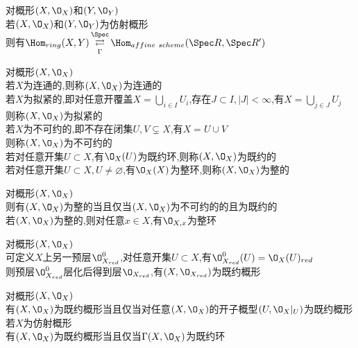 \begin{dingli}
对概形$(X,\O_{X})$和$(Y,\O_{Y})$\\
若$(X,\O_{X})$和$(Y,\O_{Y})$为仿射概形\\
则有$\Hom_{ring}(X,Y)\mathop{\rightleftarrows}\limits_{\Gamma}^{\Spec}\Hom_{affine\ scheme}(\Spec R,\Spec R')$
\end{dingli}

\begin{dingyi}
对概形$(X,\O_{X})$\\
若$X$为连通的,则称$(X,\O_{X})$为连通的\\
若$X$为拟紧的,即对任意开覆盖$X=\bigcup\limits_{i\in I}U_i$,存在$J\subset I,|J|<\infty$,有$X=\bigcup\limits_{j\in J}U_j$\\
则称$(X,\O_{X})$为拟紧的\\
若$X$为不可约的,即不存在闭集$U,V\subsetneq X$,有$X=U\cup V$\\
则称$(X,\O_{X})$为不可约的\\
若对任意开集$U\subset X$,有$\O_{X}(U)$为既约环,则称$(X,\O_{X})$为既约的\\
若对任意开集$U\subset X,U\neq \varnothing$,有$\O_{X}(X)$为整环,则称$(X,\O_{X})$为整的
\end{dingyi}

\begin{dingli}
对概形$(X,\O_{X})$\\
则有$(X,\O_{X})$为整的当且仅当$(X,\O_{X})$为不可约的的且为既约的\\
若$(X,\O_{X})$为整的,则对任意$x\in X$,有$\O_{X,x}$为整环
\end{dingli}

\begin{dingli}
对概形$(X,\O_{X})$\\
可定义$X$上另一预层$\O_{X_{red}}^{0}$,对任意开集$U\subset X$,有$\O_{X_{red}}^{0}(U)=\O_{X}(U)_{red}$\\
则预层$\O_{X_{red}}^{0}$层化后得到层$\O_{X_{red}}$,有$(X,\O_{X_{red}})$为既约概形
\end{dingli}

\begin{dingli}
对概形$(X,\O_{X})$\\
有$(X,\O_{X})$为既约概形当且仅当对任意$(X,\O_{X})$的开子概型$(U,\O_{X}|_{U})$为既约概形\\
若$X$为仿射概形\\
有$(X,\O_{X})$为既约概形当且仅当$\Gamma(X,\O_{X})$为既约环
\end{dingli}

